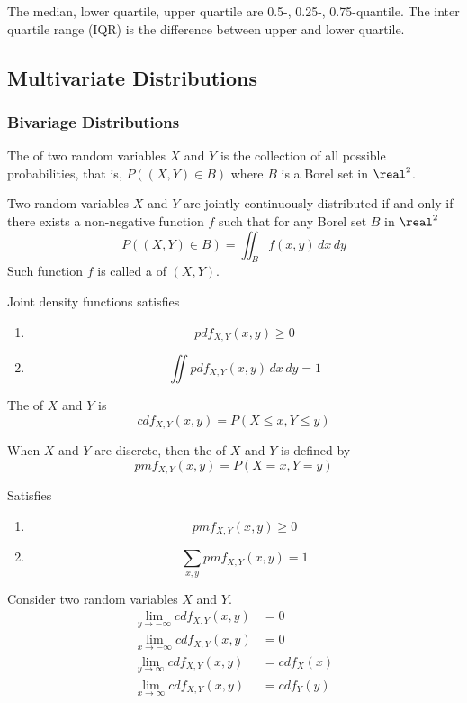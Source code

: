 \documentclass[11pt]{article}
\begin{document}
 The median, lower quartile, upper quartile are 0.5-, 0.25-, 0.75-quantile. The inter quartile range (IQR) is the difference between upper and lower quartile.

\subsection{Multivariate Distributions}
\subsubsection{Bivariage Distributions}
The  of two random variables $X$ and $Y$ is the collection of all possible probabilities, that is, $P((X, Y) \in B)$ where $B$ is a Borel set in $\real^2$.

Two random variables $X$ and $Y$ are jointly continuously distributed if and only if there exists a non-negative function $f$ such that for any Borel set $B$ in $\real^2$
$$P((X, Y) \in B) = \iint_B f(x,y)\,dx\,dy$$
Such function $f$ is called a  of $(X, Y)$.

Joint density functions satisfies
\begin{enumerate}
	\item $$pdf_{X,Y}(x,y) \geq 0$$
	\item $$\iint pdf_{X, Y} (x,y) \,dx\,dy = 1$$
\end{enumerate}

The  of $X$ and $Y$ is
$$cdf_{X,Y}(x,y) = P(X \leq x, Y \leq y)$$


When $X$ and $Y$ are discrete, then the  of $X$ and $Y$ is defined by
$$pmf_{X,Y}(x,y) = P(X=x, Y=y)$$



 Satisfies \\
\begin{enumerate}
	\item $$pmf_{X,Y}(x,y) \geq 0$$
	\item $$\sum_{x,y} pmf_{X, Y} (x,y) = 1$$
\end{enumerate}

\theorem
Consider two random variables $X$ and $Y$.
\begin{align*}
	\underset{y \rightarrow - \infty}{\lim}cdf_{X,Y}(x,y) &= 0 \\
	\underset{x \rightarrow - \infty}{\lim}cdf_{X,Y}(x,y) &= 0 \\
	\underset{y \rightarrow  \infty}{\lim}cdf_{X,Y}(x,y) &= cdf_X(x) \\
	\underset{x \rightarrow  \infty}{\lim}cdf_{X,Y}(x,y) &= cdf_Y(y) \\
\end{align*}
\end{document}
